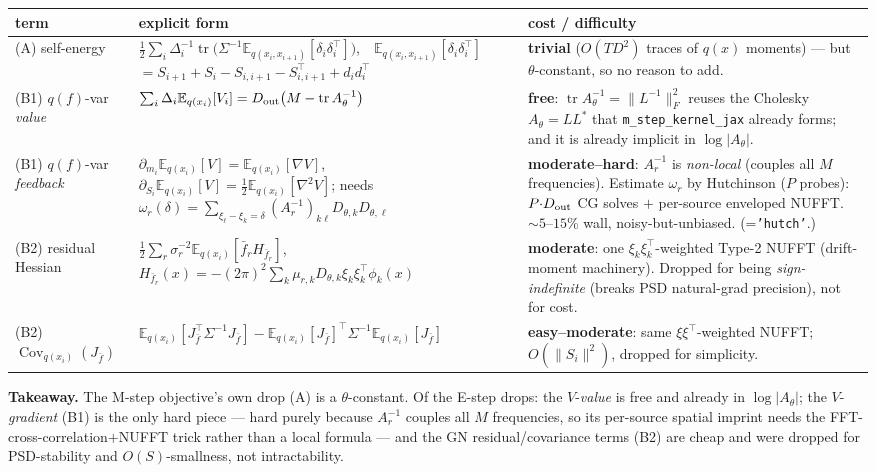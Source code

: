 \documentclass[11pt]{article}
\newcommand{\Eqx}{\mathbb{E}_{q(x_i)}}
\newcommand{\Eqxx}{\mathbb{E}_{q(x_i,x_{i+1})}}
\newcommand{\tr}{\operatorname{tr}}
\newcommand{\Cov}{\operatorname{Cov}}
\newcommand{\code}[1]{\texttt{#1}}
\newcommand{\Dt}{D_{\rm out}}
\begin{document}
\begin{center}\footnotesize
\renewcommand{\arraystretch}{1.5}
\begin{tabular}{@{}p{2.35cm} p{4.75cm} p{5.35cm}@{}}
\toprule
term & explicit form & cost / difficulty \\
\midrule
(A) self-energy &
$\tfrac12\sum_i\Delta_i^{-1}\tr\!\big(\Sigma^{-1}\Eqxx[\delta_i\delta_i^\top]\big)$,\ \
$\Eqxx[\delta_i\delta_i^\top]$ $= S_{i+1}{+}S_i{-}S_{i,i+1}{-}S_{i,i+1}^\top{+}d_id_i^\top$ &
\textbf{trivial} ($O(TD^2)$ traces of $q(x)$ moments) --- but $\theta$-constant, so no reason to add. \\
(B1) $q(f)$-var \emph{value} &
$\sum_i\Delta_i\Eqx[V_i]=\Dt\big(M-\tr A_\theta^{-1}\big)$ &
\textbf{free}: $\tr A_\theta^{-1}{=}\|L^{-1}\|_F^2$ reuses the Cholesky $A_\theta{=}LL^*$ that \code{m\_step\_kernel\_jax} already forms; and it is already implicit in $\log|A_\theta|$. \\
(B1) $q(f)$-var \emph{feedback} &
$\partial_{m_i}\Eqx[V]{=}\Eqx[\nabla V]$, $\partial_{S_i}\Eqx[V]{=}\tfrac12\Eqx[\nabla^2 V]$;
needs $\omega_r(\delta){=}\!\!\sum_{\xi_\ell-\xi_k=\delta}\!\!(A_r^{-1})_{k\ell}D_{\theta,k}D_{\theta,\ell}$ &
\textbf{moderate--hard}: $A_r^{-1}$ is \emph{non-local} (couples all $M$ frequencies). Estimate $\omega_r$ by Hutchinson ($P$ probes): $P{\cdot}\Dt$ CG solves $+$ per-source enveloped NUFFT. ${\sim}5$--$15\%$ wall, noisy-but-unbiased. (=\texttt{'hutch'}.) \\
(B2) residual Hessian &
$\tfrac12\sum_r\sigma_r^{-2}\Eqx[\bar f_r H_{\bar f_r}]$,\ \
$H_{\bar f_r}(x){=}-(2\pi)^2\!\sum_k\mu_{r,k}D_{\theta,k}\xi_k\xi_k^\top\phi_k(x)$ &
\textbf{moderate}: one $\xi_k\xi_k^\top$-weighted Type-2 NUFFT (drift-moment machinery). Dropped for being \emph{sign-indefinite} (breaks PSD natural-grad precision), not for cost. \\
(B2) $\Cov_{q(x_i)}(J_{\bar f})$ &
$\Eqx[J_{\bar f}^\top\Sigma^{-1}J_{\bar f}]-\Eqx[J_{\bar f}]^\top\Sigma^{-1}\Eqx[J_{\bar f}]$ &
\textbf{easy--moderate}: same $\xi\xi^\top$-weighted NUFFT; $O(\|S_i\|^2)$, dropped for simplicity. \\
\bottomrule
\end{tabular}
\end{center}

\noindent
\textbf{Takeaway.} The M-step objective's own drop (A) is a $\theta$-constant. Of the
E-step drops: the $V$-\emph{value} is free and already in $\log|A_\theta|$; the $V$-\emph{gradient}
(B1) is the only hard piece --- hard purely because $A_r^{-1}$ couples all $M$ frequencies,
so its per-source spatial imprint needs the FFT-cross-correlation$+$NUFFT trick rather than
a local formula --- and the GN residual/covariance terms (B2) are cheap and were dropped for
PSD-stability and $O(S)$-smallness, not intractability.
\end{document}
